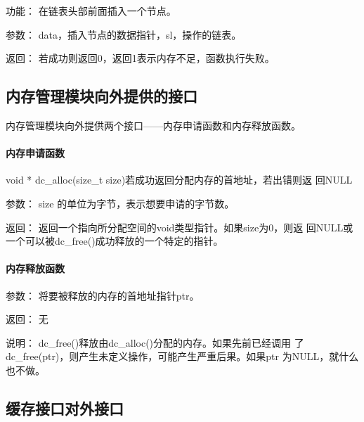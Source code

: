 	\begin{compactdesc}
	\item[功能：]在链表头部前面插入一个节点。
	\item[参数：]data，插入节点的数据指针，sl，操作的链表。
	\item[返回：]若成功则返回0，返回1表示内存不足，函数执行失败。
	\end{compactdesc}


\subsection{内存管理模块向外提供的接口}
内存管理模块向外提供两个接口——内存申请函数和内存释放函数。
\paragraph{内存申请函数}
	{void * dc\_alloc(size\_t size)}{若成功返回分配内存的首地址，若出错则返
	回NULL}
	\begin{compactdesc}
	\item[参数：]size 的单位为字节，表示想要申请的字节数。
	\item[返回：]返回一个指向所分配空间的void类型指针。如果size为0，则返
	回NULL或一个可以被dc\_free()成功释放的一个特定的指针。
	\end{compactdesc}
\paragraph{内存释放函数}
	\begin{compactdesc}
	\item[参数：]将要被释放的内存的首地址指针ptr。
	\item[返回：]无
	\item[说明：]dc\_free()释放由dc\_alloc()分配的内存。如果先前已经调用
		了dc\_free(ptr)，则产生未定义操作，可能产生严重后果。如果ptr
		为NULL，就什么也不做。 
	\end{compactdesc}

\subsection{缓存接口对外接口}

%
